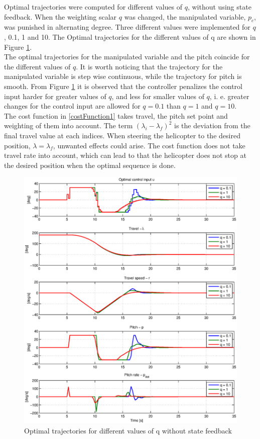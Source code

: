\documentclass[11pt,a4paper,USenglish]{article} %
\begin{document}
Optimal trajectories were computed for different values of $q$, without using state feedback. When the weighting scalar $q$ was changed, the manipulated variable, $p_c$, was punished in alternating degree.
Three different values were implemented for $q$, 0.1, 1 and 10. The Optimal trajectories for the different values of q are shown in Figure \ref{fig:q_0.1_1_10}.\\
The optimal trajectories for the manipulated variable and the pitch coincide for the different values of $q$. It is worth noticing that the trajectory for the manipulated variable is step wise continuous, while the trajectory for pitch is smooth.
From Figure \ref{fig:q_0.1_1_10} it is observed that the controller penalizes the control input harder for greater values of $q$, and less for smaller values of $q$, i. e. greater changes for the control input are allowed for $q=0.1$ than $q=1$ and $q=10$.\\

The cost function in \eqref{costFunction1} takes travel, the pitch set point and weighting of them into account. The term $(\lambda_i-\lambda_f)^2$ is the deviation from the final travel value at each indices. When steering the helicopter to the desired position, $\lambda=\lambda_f$, unwanted effects could arise. The cost function does not take travel rate into account, which can lead to that the helicopter does not stop at the desired position when the optimal sequence is done. 

\begin{figure}[!h]
    \begin{minipage}{\textwidth}
\centerline{\includegraphics[width=1.3\textwidth]{optreg_10_2_3_Comparison_of_q_}}
    \end{minipage}
    \caption{Optimal trajectories for different values of q without state feedback}
	\label{fig:q_0.1_1_10}
\end{figure}
\end{document}
